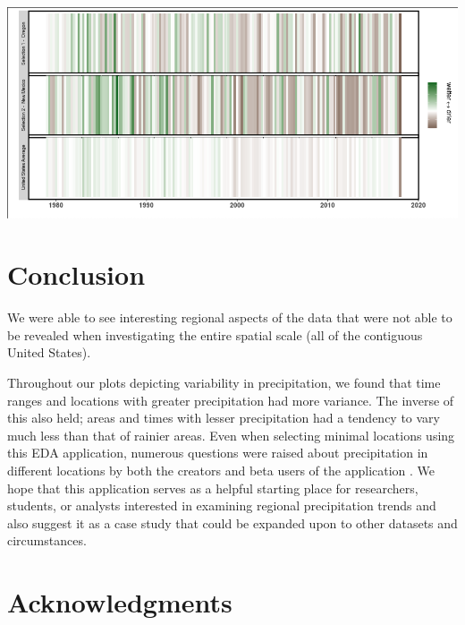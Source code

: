 \documentclass[10pt,letterpaper]{article}
\begin{document}
\begin{center}
  \includegraphics[width = .8\textwidth]{graphics/precipitation_strips}
\end{center}





\section*{Conclusion}

We were able to see interesting regional aspects of the data that were not able to be revealed when investigating the entire spatial scale (all of the contiguous United States).

Throughout our plots depicting variability in precipitation, we found that time ranges and locations with greater precipitation had more variance. The inverse of this also held; areas and times with lesser precipitation had a tendency to vary much less than that of rainier areas.
Even when selecting minimal locations using this EDA application, numerous questions were raised about precipitation in different locations by both the creators and beta users of the application . We hope that this application serves as a helpful starting place for researchers, students, or analysts interested in examining regional precipitation trends and also suggest it as a case study that could be expanded upon to other datasets and circumstances.






\section*{Acknowledgments}
\end{document}
